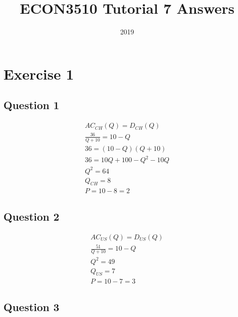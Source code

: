 \documentclass{article}
\title{ECON3510 Tutorial 7 Answers}
\date{2019}
\begin{document}
\maketitle

\section{Exercise 1}
\vspace{6mm}
\subsection{Question 1}

\begin{gather*}
  AC_{CH} (Q) = D_{CH}(Q) \\
  \frac{36}{Q+10} = 10 - Q \\
  36 = (10 - Q) (Q + 10) \\
  36 = 10Q + 100 - Q^{2} -10Q \\
  Q^{2} = 64 \\
  Q_{CH} = 8 \\
  P = 10 - 8 = 2
\end{gather*}

\par \vspace{0.8em}
\subsection{Question 2}

\begin{gather*}
  AC_{US} (Q) = D_{US}(Q) \\
  \frac{51}{Q + 10} = 10 - Q \\
  Q^{2} = 49 \\
  Q_{US} = 7 \\
  P = 10 - 7 = 3
\end{gather*}

\par \vspace{0.8em}
\subsection{Question 3}
\end{document}
